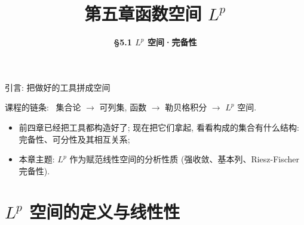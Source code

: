 


\title[第五章\\
函数空间Lp]{\texorpdfstring{\LARGE \bfseries 第五章\quad 函数空间 $L^p$}{第五章 函数空间Lp}} %
\author[\S 5.1\\
Lp空间·完备性] %
{\Large \bfseries \S 5.1 $L^p$ 空间·完备性}
\date{}





\begin{frame}

\titlepage

\end{frame}




\begin{frame}{引言: 把做好的工具拼成空间}

课程的链条: \ 集合论 $\longrightarrow$ 可列集, 函数 $\longrightarrow$ 勒贝格积分
$\longrightarrow$ \alert{$L^p$ 空间}.

\begin{itemize}
\item 前四章已经把工具都构造好了; 现在把它们\alert{拿起}, 看看构成的集合有什么结构: 完备性、可分性及其相互关系;
\item 本章主题: $L^p$ 作为\alert{赋范线性空间}的分析性质
  (强收敛、基本列、Riesz-Fischer 完备性).
\end{itemize}

\end{frame}


\section[Lp 空间]{$L^p$ 空间的定义与线性性}

